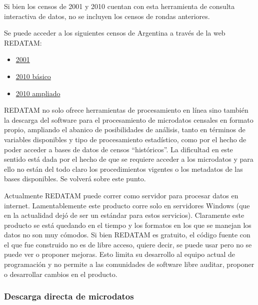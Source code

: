 \documentclass[
]{article}
\providecommand{\tightlist}{%
  \setlength{\itemsep}{0pt}\setlength{\parskip}{0pt}}
\begin{document}
Si bien los censos de 2001 y 2010 cuentan con esta herramienta de consulta interactiva de datos, no se incluyen los censos de rondas anteriores.

Se puede acceder a los siguientes censos de Argentina a través de la web REDATAM:

\begin{itemize}
\tightlist
\item
  \href{https://redatam.indec.gob.ar/argbin/RpWebEngine.exe/PortalAction?\&MODE=MAIN\&BASE=CPV2001ARG\&MAIN=WebServerMain.inl\&_ga=2.209433750.505137327.1603741558-822725481.1603741558}{2001}
\item
  \href{https://redatam.indec.gob.ar/argbin/RpWebEngine.exe/PortalAction?\&MODE=MAIN\&BASE=CPV2010B\&MAIN=WebServerMain.inl\&_ga=2.251878541.505137327.1603741558-822725481.1603741558}{2010 básico}
\item
  \href{https://redatam.indec.gob.ar/argbin/RpWebEngine.exe/PortalAction?\&MODE=MAIN\&BASE=CPV2010A\&MAIN=WebServerMain.inl\&_ga=2.248606851.505137327.1603741558-822725481.1603741558}{2010 ampliado}
\end{itemize}

REDATAM no solo ofrece herramientas de procesamiento en línea sino también la descarga del software para el procesamiento de microdatos censales en formato propio, ampliando el abanico de posibilidades de análisis, tanto en términos de variables disponibles y tipo de procesamiento estadístico, como por el hecho de poder acceder a bases de datos de censos ``históricos''. La dificultad en este sentido está dada por el hecho de que se requiere acceder a los microdatos y para ello no están del todo claro los procedimientos vigentes o los metadatos de las bases disponibles. Se volverá sobre este punto.

Actualmente REDATAM puede correr como servidor para procesar datos en internet. Lamentablemente este producto corre solo en servidores Windows (que en la actualidad dejó de ser un estándar para estos servicios). Claramente este producto se está quedando en el tiempo y los formatos en los que se manejan los datos no son muy cómodos. Si bien REDATAM es gratuito, el código fuente con el que fue construido no es de libre acceso, quiere decir, se puede usar pero no se puede ver o proponer mejoras. Esto limita su desarrollo al equipo actual de programación y no permite a las comunidades de software libre auditar, proponer o desarrollar cambios en el producto.

\hypertarget{descarga-directa-de-microdatos}{%
\subsubsection{Descarga directa de microdatos}\label{descarga-directa-de-microdatos}}
\end{document}
